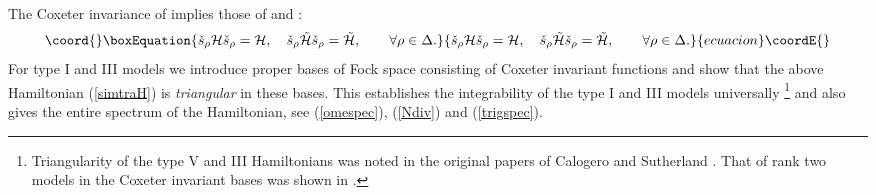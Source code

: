 \documentclass[a4paper,12pt]{article}
\begin{document}
The Coxeter invariance of \coordHE{} implies those of \coordHE{} and
\coordHE{}:
\begin{equation}\coord{}\boxEquation{
   \check{s}_{\rho}{\cal H}\check{s}_{\rho}={\cal H}, \quad
   \check{s}_{\rho}\tilde{\cal H}\check{s}_{\rho}=\tilde{\cal H},\qquad
   \forall
   \rho\in\Delta.
   \label{Htilinv}
}{
   \check{s}_{\rho}{\cal H}\check{s}_{\rho}={\cal H}, \quad
   \check{s}_{\rho}\tilde{\cal H}\check{s}_{\rho}=\tilde{\cal H},\qquad
   \forall
   \rho\in\Delta.
   }{ecuacion}\coordE{}\end{equation}
For type I and III models we introduce proper bases of Fock space
consisting of Coxeter invariant functions and show that the above
Hamiltonian \coordHE{} (\ref{simtraH}) is {\em triangular\/} in
these
bases.
This establishes the integrability of the type I and III models
universally
\footnote{Triangularity of the \coordHE{} type V and III Hamiltonians
was noted in the original papers of Calogero \cite{Cal} and Sutherland
\cite{Sut}. That of rank two models in the Coxeter invariant bases was
shown in \cite{HeOp,ruhl}.}
and also gives the entire spectrum  of the Hamiltonian, see
(\ref{omespec}), (\ref{Ndiv}) and (\ref{trigspec}).


\bigskip
\end{document}
